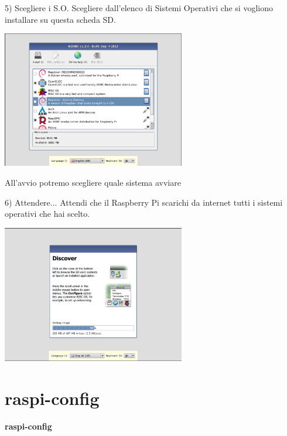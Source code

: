 \documentclass[xcolor=svgnames,11pt]{beamer}
\begin{document}
\begin{frame}{5) Scegliere i S.O.}
Scegliere dall'elenco di Sistemi Operativi che si vogliono installare su questa scheda SD.

\medskip
\begin{center}
\includegraphics[width=8cm]{guide/5.png}
\end{center}

All'avvio potremo scegliere quale sistema avviare

\end{frame}


\begin{frame}{6) Attendere...}
Attendi che il Raspberry Pi scarichi da internet tutti i sistemi operativi che hai scelto.

\medskip
\begin{center}
\includegraphics[width=8cm]{guide/6.png}
\end{center}
\end{frame}

\section{raspi-config}
\begin{frame}{}
\begin{center}
\begin{Huge}
{\color{green_raspi} \textbf{raspi-config}}
\end{Huge}
\end{center}
\end{frame}
\end{document}
